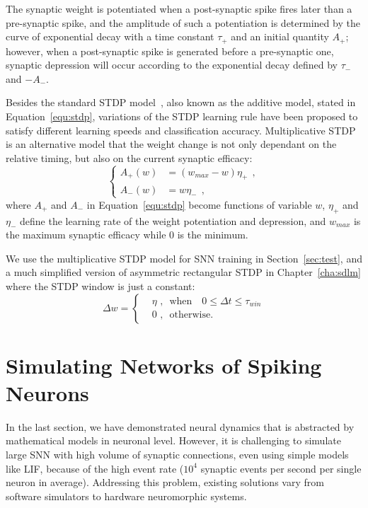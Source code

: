 The synaptic weight is potentiated when a post-synaptic spike fires later than a pre-synaptic spike, and the amplitude of such a potentiation is determined by the curve of exponential decay with a time constant $\tau_+$ and an initial quantity $A_+$;
however, when a post-synaptic spike is generated before a pre-synaptic one, synaptic depression will occur according to the exponential decay defined by $\tau_-$ and $-A_-$.

Besides the standard STDP model~\cite{song2000competitive}, also known as the additive model, stated in Equation~\ref{equ:stdp}, variations of the STDP learning rule have been proposed to satisfy different learning speeds and classification accuracy.
Multiplicative STDP~\cite{morrison2008phenomenological} is an alternative model that the weight change is not only dependant on the relative timing, but also on the current synaptic efficacy:
\begin{equation}
\left\{
\begin{aligned}
A_+ (w) &=  (w_{max} - w)\eta_+~~, \\
A_- (w) &= w\eta_-~~,
\end{aligned}
\right.
\end{equation}
where $A_+$ and $A_-$ in Equation~\ref{equ:stdp} become functions of variable 
$w$, $\eta_+$ and $\eta_-$ define the learning rate of the weight potentiation and depression, and $w_{max}$ is the maximum synaptic efficacy while 0 is the minimum.

We use the multiplicative STDP model for SNN training in Section~\ref{sec:test}, and a much simplified version of asymmetric rectangular STDP in Chapter~\ref{cha:sdlm} where the STDP window is just a constant:
\begin{equation}
\Delta w = \left\{
\begin{aligned}
&\eta \textrm{~,~~when~~~} 0 \leq \Delta  t \leq \tau_{win}\\
& 0 \textrm{~,~~otherwise}.
\end{aligned}
\right.
\end{equation}

\section{Simulating Networks of Spiking Neurons}
\label{sec:snn_sim}
In the last section, we have demonstrated neural dynamics that is abstracted by mathematical models in neuronal level.
However, it is challenging to simulate large SNN with high volume of synaptic connections, even using simple models like LIF, because of the high event rate ($10^4$ synaptic events per second per single neuron in average).
Addressing this problem, existing solutions vary from software simulators to hardware neuromorphic systems.

